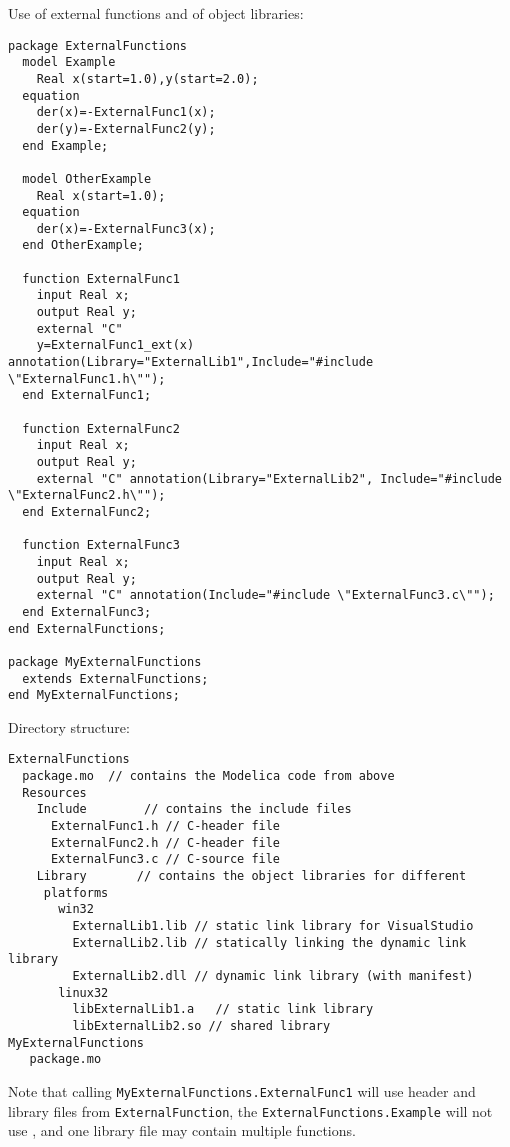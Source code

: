 \begin{example}
Use of external functions and of object libraries:
\begin{lstlisting}[language=modelica]
package ExternalFunctions
  model Example
    Real x(start=1.0),y(start=2.0);
  equation
    der(x)=-ExternalFunc1(x);
    der(y)=-ExternalFunc2(y);
  end Example;

  model OtherExample
    Real x(start=1.0);
  equation
    der(x)=-ExternalFunc3(x);
  end OtherExample;

  function ExternalFunc1
    input Real x;
    output Real y;
    external "C"
    y=ExternalFunc1_ext(x) annotation(Library="ExternalLib1",Include="#include \"ExternalFunc1.h\"");
  end ExternalFunc1;

  function ExternalFunc2
    input Real x;
    output Real y;
    external "C" annotation(Library="ExternalLib2", Include="#include \"ExternalFunc2.h\"");
  end ExternalFunc2;

  function ExternalFunc3
    input Real x;
    output Real y;
    external "C" annotation(Include="#include \"ExternalFunc3.c\"");
  end ExternalFunc3;
end ExternalFunctions;

package MyExternalFunctions
  extends ExternalFunctions;
end MyExternalFunctions;
\end{lstlisting}
Directory structure:
\begin{lstlisting}[language=modelica]
ExternalFunctions
  package.mo  // contains the Modelica code from above
  Resources
    Include        // contains the include files
      ExternalFunc1.h // C-header file
      ExternalFunc2.h // C-header file
      ExternalFunc3.c // C-source file
    Library       // contains the object libraries for different
     platforms
       win32
         ExternalLib1.lib // static link library for VisualStudio
         ExternalLib2.lib // statically linking the dynamic link library
         ExternalLib2.dll // dynamic link library (with manifest)
       linux32
         libExternalLib1.a   // static link library
         libExternalLib2.so // shared library
MyExternalFunctions
   package.mo
\end{lstlisting}
Note that calling \lstinline!MyExternalFunctions.ExternalFunc1! will use
header and library files from \lstinline!ExternalFunction!, the \lstinline!ExternalFunctions.Example! will not use ,
and one library file may contain multiple functions.


\end{example}
